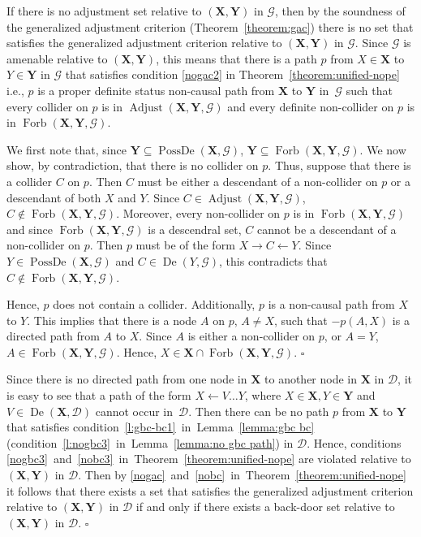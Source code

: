 \documentclass[11pt,a4paper]{article}
\newenvironment{proofof}[1][]{\begin{trivlist}
   \item[\hskip \labelsep {\bfseries Proof of #1.}]}{\hfill{}$\square$\end{trivlist}}
\DeclareMathOperator{\PossDe}{PossDe}
\DeclareMathOperator{\De}{De}
\DeclareMathOperator{\Adjust}{Adjust}
\DeclareMathOperator{\Forbi}{Forb}
\newcommand{\g}[1][G]{\mathcal{#1}}
\newcommand{\adjustb}[2][X,Y]{\Adjust(\mathbf{#1},#2)}
\newcommand{\fb}[2][X,Y]{\Forbi(\mathbf{#1},#2)}%
\begin{document}
\begin{proofof}[Corollary~\ref{cor:noforbx}]
If there is no adjustment set relative to $(\mathbf{X,Y})$ in $\g$, then by the soundness of the generalized adjustment criterion (Theorem~\ref{theorem:gac}) there is no set that satisfies the generalized adjustment criterion relative to $(\mathbf{X,Y})$ in $\g$. Since $\g$ is amenable relative to $(\mathbf{X,Y})$, this means that there is a path $p$ from $X \in \mathbf{X}$ to $Y \in \mathbf{Y}$ in $\g$ that satisfies condition \ref{nogac2} in Theorem~\ref{theorem:unified-nope} i.e., $p$ is a proper definite status non-causal path from $\mathbf{X}$ to $\mathbf{Y}$ in~$\g$ such that every collider on $p$ is in $\adjustb{\g}$ and every definite non-collider on $p$ is in $\fb{\g}$.

We first note that, since $\mathbf{Y} \subseteq \PossDe(\mathbf{X},\g)$, $\mathbf{Y} \subseteq \fb{\g}$. We now show, by contradiction, that there is no collider on $p$. Thus, suppose that there is a collider $C$ on $p$. Then $C$ must be either a descendant of a non-collider on $p$ or a descendant of both $X$ and $Y$. Since $C \in \adjustb{\g}$, $C \notin \fb{\g}$. Moreover, every non-collider on $p$ is in $\fb{\g}$ and since $\fb{\g}$ is a descendral set, $C$ cannot be a descendant of a non-collider on $p$. Then $p$ must be of the form $X \rightarrow C \leftarrow Y$.  Since $Y \in \PossDe(\mathbf{X},\g)$ and $C \in \De(Y,\g)$, this contradicts that $C \notin \fb{\g}$. 

Hence, $p$ does not contain a collider. Additionally, $p$ is a non-causal path from $X$ to $Y$. This implies that there is a node $A$ on $p$, $A \neq X$, such that $-p(A,X)$ is a directed path from $A$ to $X$. Since $A$ is either a non-collider on $p$, or $A =Y$, $A \in \fb{\g}$. Hence, $X \in \mathbf{X} \cap \fb{\g}$.  
\end{proofof}


\begin{proofof}[Corollary~\ref{cor:equivalence gac bc}]
Since there is no directed path from one node in $\mathbf{X}$ to another node in $\mathbf{X}$ in $\g[D]$, it is easy to see that a path of the form $ X \leftarrow V \dots Y$, where $X \in \mathbf{X}, Y \in \mathbf{Y}$ and $V \in \De(\mathbf{X},\g[D])$ cannot occur in~$\g[D]$. Then there can be no path $p$ from $\mathbf{X}$ to $\mathbf{Y}$ that satisfies condition~\ref{l:gbc-bc1}~in~Lemma~\ref{lemma:gbc bc} (condition~\ref{l:nogbc3}~in~Lemma~\ref{lemma:no gbc path}) in $\g[D]$. Hence, conditions \ref{nogbc3}~and~\ref{nobc3}~in~Theorem~\ref{theorem:unified-nope} are violated relative to $(\mathbf{X,Y})$ in $\g[D]$. Then by \ref{nogac}~and~\ref{nobc}~in~Theorem~\ref{theorem:unified-nope} it follows that there exists a set that satisfies the generalized adjustment criterion relative to $(\mathbf{X,Y})$ in $\g[D]$ if and only if there exists a back-door set relative to $(\mathbf{X,Y})$ in $\g[D]$.
\end{proofof}
\end{document}
